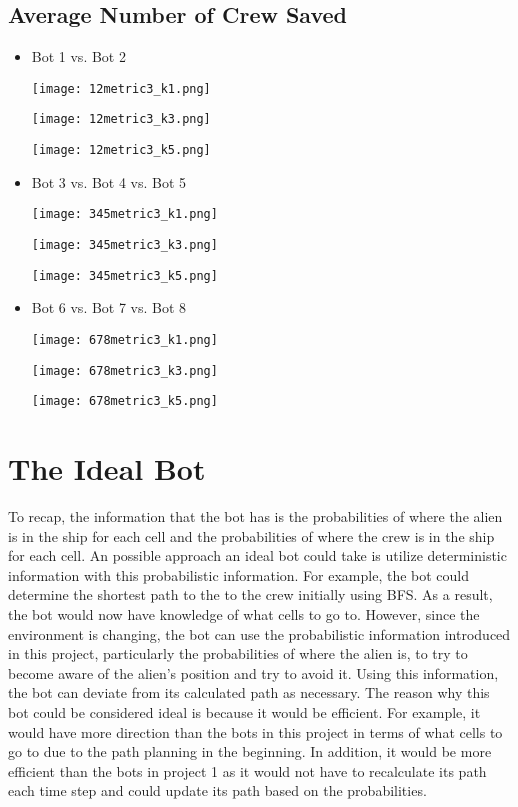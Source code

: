 \documentclass[11pt]{article}
\begin{document}
\subsection{Average Number of Crew Saved}

\begin{itemize}
    \item Bot 1 vs. Bot 2

    \texttt{[image: 12metric3\_k1.png]}

    \texttt{[image: 12metric3\_k3.png]}

    \texttt{[image: 12metric3\_k5.png]}
    
    \item Bot 3 vs. Bot 4 vs. Bot 5

    \texttt{[image: 345metric3\_k1.png]}

    \texttt{[image: 345metric3\_k3.png]}

    \texttt{[image: 345metric3\_k5.png]}
    
    \item Bot 6 vs. Bot 7 vs. Bot 8

    \texttt{[image: 678metric3\_k1.png]}

    \texttt{[image: 678metric3\_k3.png]}

    \texttt{[image: 678metric3\_k5.png]}

\end{itemize}


\section{The Ideal Bot}

To recap, the information that the bot has is the probabilities of where the alien is in the ship for each cell and the probabilities of where the crew is in the ship for each cell. An possible approach an ideal bot could take is utilize deterministic information with this probabilistic information. For example, the bot could determine the shortest path to the to the crew initially using BFS. As a result, the bot would now have knowledge of what cells to go to. However, since the environment is changing, the bot can use the probabilistic information introduced in this project, particularly the probabilities of where the alien is, to try to become aware of the alien's position and try to avoid it. Using this information, the bot can deviate from its calculated path as necessary. The reason why this bot could be considered ideal is because it would be efficient. For example, it would have more direction than the bots in this project in terms of what cells to go to due to the path planning in the beginning. In addition, it would be more efficient than the bots in project 1 as it would not have to recalculate its path each time step and could update its path based on the probabilities. 
\end{document}
